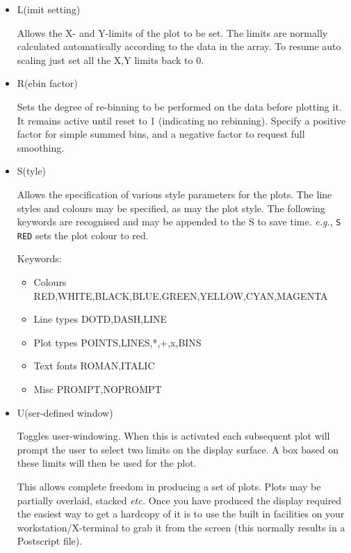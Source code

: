 \begin{itemize}
\item {\sunspec{\Large\tt}{\bf} L}(imit setting)

     Allows the X- and Y-limits of the plot to be set.
     The limits are normally calculated automatically
     according to the data in the array. To resume auto scaling just set
     all the X,Y limits back to 0.

\item{\sunspec{\Large\tt}{\bf} R}(ebin factor)

     Sets the degree of re-binning to be
     performed on the data before plotting it. It remains active until
     reset to 1 (indicating no rebinning). Specify a positive factor for
     simple summed bins, and a negative factor to request full smoothing.

\item{\sunspec{\Large\tt}{\bf} S}(tyle)

     Allows the specification of various style
     parameters for the plots. The line styles and colours may be
     specified, as may the plot style. The following keywords are
     recognised and may be appended to the S to save time. {\it{e.g.}},
     \verb+S RED+ sets the plot colour to red.

     Keywords:

     \begin{itemize}

     \item {Colours} RED,WHITE,BLACK,BLUE,GREEN,YELLOW,CYAN,MAGENTA
     \item {Line types} DOTD,DASH,LINE
     \item {Plot types} POINTS,LINES,*,+,x,BINS
     \item {Text fonts} ROMAN,ITALIC
     \item {Misc} PROMPT,NOPROMPT

     \end{itemize}

\item{\sunspec{\Large\tt}{\bf} U}(ser-defined window)

     Toggles user-windowing.
     When this is activated each subsequent plot will prompt the user to select
     two limits on the display surface. A box based on these limits will then
     be used for the plot.

     This allows complete freedom in producing a set of plots. Plots may
     be partially overlaid, stacked {\it etc.} Once you have produced the
     display required the easiest way to get a hardcopy of it is to use
     the built in facilities on your workstation/X-terminal to grab it
     from the screen (this normally results in a Postscript file).


\end{itemize}
